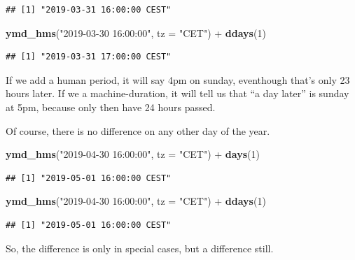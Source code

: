 \documentclass[]{tufte-book}
\newenvironment{Shaded}{}{}
\newcommand{\DataTypeTok}[1]{\textcolor[rgb]{0.56,0.13,0.00}{#1}}
\newcommand{\DecValTok}[1]{\textcolor[rgb]{0.25,0.63,0.44}{#1}}
\newcommand{\KeywordTok}[1]{\textcolor[rgb]{0.00,0.44,0.13}{\textbf{#1}}}
\newcommand{\NormalTok}[1]{#1}
\newcommand{\OperatorTok}[1]{\textcolor[rgb]{0.40,0.40,0.40}{#1}}
\newcommand{\StringTok}[1]{\textcolor[rgb]{0.25,0.44,0.63}{#1}}
\begin{document}
\begin{verbatim}
## [1] "2019-03-31 16:00:00 CEST"
\end{verbatim}

\begin{Shaded}
\begin{Highlighting}[]
\KeywordTok{ymd_hms}\NormalTok{(}\StringTok{"2019-03-30 16:00:00"}\NormalTok{, }\DataTypeTok{tz =} \StringTok{"CET"}\NormalTok{) }\OperatorTok{+}\StringTok{ }\KeywordTok{ddays}\NormalTok{(}\DecValTok{1}\NormalTok{)}
\end{Highlighting}
\end{Shaded}

\begin{verbatim}
## [1] "2019-03-31 17:00:00 CEST"
\end{verbatim}

If we add a human period, it will say 4pm on sunday, eventhough that's only 23 hours later. If we a machine-duration, it will tell us that ``a day later'' is sunday at 5pm, because only then have 24 hours passed.

Of course, there is no difference on any other day of the year.

\begin{Shaded}
\begin{Highlighting}[]
\KeywordTok{ymd_hms}\NormalTok{(}\StringTok{"2019-04-30 16:00:00"}\NormalTok{, }\DataTypeTok{tz =} \StringTok{"CET"}\NormalTok{) }\OperatorTok{+}\StringTok{ }\KeywordTok{days}\NormalTok{(}\DecValTok{1}\NormalTok{)}
\end{Highlighting}
\end{Shaded}

\begin{verbatim}
## [1] "2019-05-01 16:00:00 CEST"
\end{verbatim}

\begin{Shaded}
\begin{Highlighting}[]
\KeywordTok{ymd_hms}\NormalTok{(}\StringTok{"2019-04-30 16:00:00"}\NormalTok{, }\DataTypeTok{tz =} \StringTok{"CET"}\NormalTok{) }\OperatorTok{+}\StringTok{ }\KeywordTok{ddays}\NormalTok{(}\DecValTok{1}\NormalTok{)}
\end{Highlighting}
\end{Shaded}

\begin{verbatim}
## [1] "2019-05-01 16:00:00 CEST"
\end{verbatim}

So, the difference is only in special cases, but a difference still.
\end{document}
